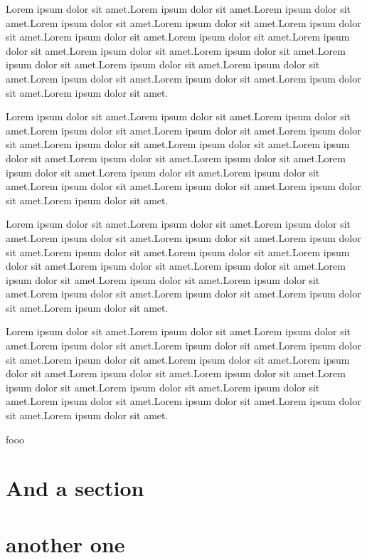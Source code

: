 \documentclass[main.tex]{subfiles}
\begin{document}
Lorem ipsum dolor sit amet.Lorem ipsum dolor sit amet.Lorem ipsum dolor sit amet.Lorem ipsum dolor sit amet.Lorem ipsum dolor sit amet.Lorem ipsum dolor sit amet.Lorem ipsum dolor sit amet.Lorem ipsum dolor sit amet.Lorem ipsum dolor sit amet.Lorem ipsum dolor sit amet.Lorem ipsum dolor sit amet.Lorem ipsum dolor sit amet.Lorem ipsum dolor sit amet.Lorem ipsum dolor sit amet.Lorem ipsum dolor sit amet.Lorem ipsum dolor sit amet.Lorem ipsum dolor sit amet.Lorem ipsum dolor sit amet.

Lorem ipsum dolor sit amet.Lorem ipsum dolor sit amet.Lorem ipsum dolor sit amet.Lorem ipsum dolor sit amet.Lorem ipsum dolor sit amet.Lorem ipsum dolor sit amet.Lorem ipsum dolor sit amet.Lorem ipsum dolor sit amet.Lorem ipsum dolor sit amet.Lorem ipsum dolor sit amet.Lorem ipsum dolor sit amet.Lorem ipsum dolor sit amet.Lorem ipsum dolor sit amet.Lorem ipsum dolor sit amet.Lorem ipsum dolor sit amet.Lorem ipsum dolor sit amet.Lorem ipsum dolor sit amet.Lorem ipsum dolor sit amet.

Lorem ipsum dolor sit amet.Lorem ipsum dolor sit amet.Lorem ipsum dolor sit amet.Lorem ipsum dolor sit amet.Lorem ipsum dolor sit amet.Lorem ipsum dolor sit amet.Lorem ipsum dolor sit amet.Lorem ipsum dolor sit amet.Lorem ipsum dolor sit amet.Lorem ipsum dolor sit amet.Lorem ipsum dolor sit amet.Lorem ipsum dolor sit amet.Lorem ipsum dolor sit amet.Lorem ipsum dolor sit amet.Lorem ipsum dolor sit amet.Lorem ipsum dolor sit amet.Lorem ipsum dolor sit amet.Lorem ipsum dolor sit amet.

Lorem ipsum dolor sit amet.Lorem ipsum dolor sit amet.Lorem ipsum dolor sit amet.Lorem ipsum dolor sit amet.Lorem ipsum dolor sit amet.Lorem ipsum dolor sit amet.Lorem ipsum dolor sit amet.Lorem ipsum dolor sit amet.Lorem ipsum dolor sit amet.Lorem ipsum dolor sit amet.Lorem ipsum dolor sit amet.Lorem ipsum dolor sit amet.Lorem ipsum dolor sit amet.Lorem ipsum dolor sit amet.Lorem ipsum dolor sit amet.Lorem ipsum dolor sit amet.Lorem ipsum dolor sit amet.Lorem ipsum dolor sit amet.

fooo

\section{And a section}
\section{another one}
\end{document}
